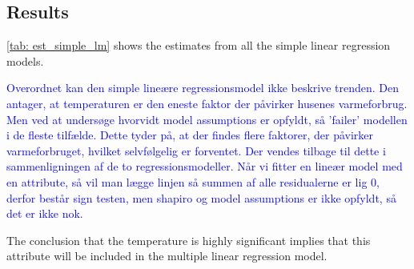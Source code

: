 \subsection{Results}
\cref{tab: est_simple_lm} shows the estimates from all the simple linear regression models. 

\noindent \textcolor{blue}{Overordnet kan den simple lineære regressionsmodel ikke beskrive trenden. Den antager, at temperaturen er den eneste faktor der påvirker husenes varmeforbrug. Men ved at undersøge hvorvidt model assumptions er opfyldt, så 'failer' modellen i de fleste tilfælde. Dette tyder på, at der findes flere faktorer, der påvirker varmeforbruget, hvilket selvfølgelig er forventet. Der vendes tilbage til dette i sammenligningen af de to regressionsmodeller. Når vi fitter en lineær model med en attribute, så vil man lægge linjen så summen af alle residualerne er lig 0, derfor består sign testen, men shapiro og model assumptions er ikke opfyldt, så det er ikke nok.}

The conclusion that the temperature is highly significant implies that this attribute will be included in the multiple linear regression model.

